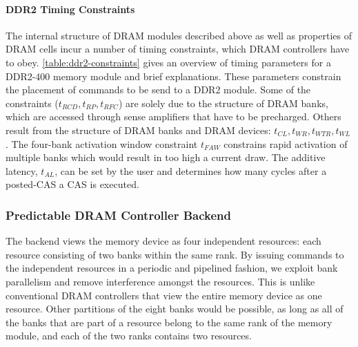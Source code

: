 \vspace{-0.5mm}
\paragraph{DDR2 Timing Constraints}

The internal structure of DRAM modules described above as well as properties of DRAM cells incur a number of timing constraints, which DRAM controllers have to obey.
\ref{table:ddr2-constraints} gives an overview of timing parameters for a DDR2-400 memory module and brief explanations.
These parameters constrain the placement of commands to be send to a DDR2 module.
Some of the constraints ($t_{RCD}, t_{RP}, t_{RFC}$) are solely due to the structure of DRAM banks, which are accessed through sense amplifiers that have to be precharged.
Others result from the structure of DRAM banks and DRAM devices: $t_{CL}, t_{WR}, t_{WTR}, t_{WL}$.
The four-bank activation window constraint $t_{FAW}$ constrains rapid activation of multiple banks which would result in too high a current draw.
The additive latency, $t_{AL}$, can be set by the user and determines how many cycles after a posted-CAS a CAS is executed.

\subsubsection{Predictable DRAM Controller Backend}
\label{sec:pret_dram_controller}

The backend views the memory device as four independent resources: each resource consisting of two banks within the same rank.
By issuing commands to the independent resources in a periodic and pipelined fashion, we exploit bank parallelism and remove interference amongst the resources. 
This is unlike conventional DRAM controllers that view the entire memory device as one resource.  
Other partitions of the eight banks would be possible, as long as all of the banks that are part of a resource belong to the same rank of the memory module, and each of the two ranks contains two resources.  

